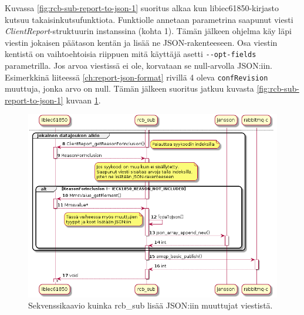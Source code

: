 Kuvassa \ref{fig:rcb-sub-report-to-json-1} suoritus alkaa kun libiec61850-kirjasto kutsuu takaisinkutsufunktiota. Funktiolle annetaan parametrina saapunut viesti \emph{ClientReport}-struktuurin instanssina (kohta 1). Tämän jälkeen ohjelma käy läpi viestin jokaisen päätason kentän ja lisää ne JSON-rakenteeseen. Osa viestin kentistä on vaihtoehtoisia riippuen mitä käyttäjä asetti \texttt{-{}-opt\--\-fields} parametrilla. Jos arvoa viestissä ei ole, korvataan se null-arvolla JSON:iin. Esimerkkinä liiteessä \ref{ch:report-json-format} rivillä 4 oleva \texttt{confRevision} muuttuja, jonka arvo on null. Tämän jälkeen suoritus jatkuu kuvasta \ref{fig:rcb-sub-report-to-json-1} kuvaan \ref{fig:rcb-sub-report-to-json-2}.

\begin{figure}[ht!]
	\includegraphics[width=1\textwidth]{pictures/rcb-sub-report-to-json_001.png}
	\caption{Sekvenssikaavio kuinka rcb\_sub lisää JSON:iin muuttujat viestistä.}
	\label{fig:rcb-sub-report-to-json-2}
\end{figure}

